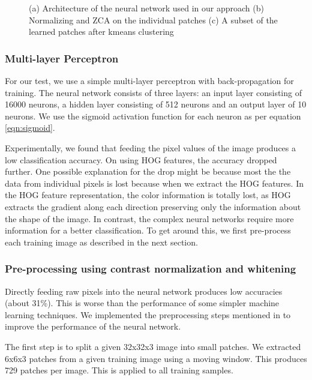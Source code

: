 \documentclass{article} %
\begin{document}
\begin{figure}
\begin{subfigure}{.2\linewidth}
        \caption{}
        \end{subfigure}
        \caption{(a) Architecture of the neural network used in our approach (b) Normalizing and ZCA on the individual patches (c) A subset of the learned patches after kmeans clustering}
    \end{figure}
 

    \subsubsection{Multi-layer Perceptron} %
    \label{sub:Multi-layer Perceptron}
        For our test, we use a simple multi-layer perceptron with back-propagation for training. The neural network consists of three layers: an input layer consisting of 16000 neurons, a hidden layer consisting of 512 neurons and an output layer of 10 neurons. We use the sigmoid activation function for each neuron as per equation \ref{eqn:sigmoid}.

        Experimentally, we found that feeding the pixel values of the image produces a low classification accuracy. On using HOG features, the accuracy dropped further. One possible explanation for the drop might be because most the the data from individual pixels is lost because when we extract the HOG features. In the HOG feature representation, the color information is totally lost, as HOG extracts the gradient along each direction preserving only the information about the shape of the image. In contrast, the complex neural networks require more information for a better classification. To get around this, we first pre-process each training image as described in the next section.

    \subsubsection{Pre-processing using contrast normalization and whitening} %
    \label{sub:Pre-processing}
        Directly feeding raw pixels into the neural network produces low accuracies (about 31\%). This is worse than the performance of some simpler machine learning techniques. We implemented the preprocessing steps mentioned in \cite{andrew} to improve the performance of the neural network. 

        The first step is to split a given 32x32x3 image into small patches. We extracted 6x6x3 patches from a given training image using a moving window. This produces 729 patches per image. This is applied to all training samples.
\end{document}
